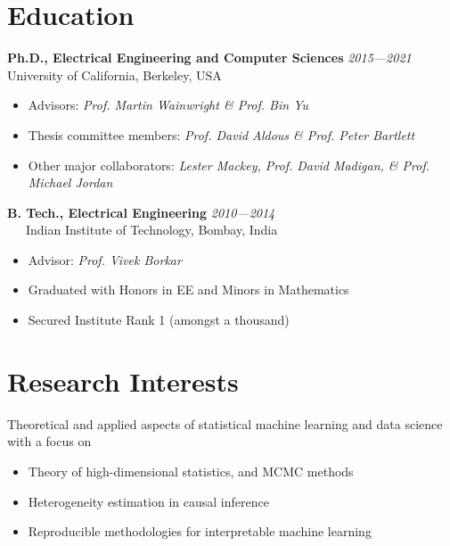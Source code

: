 \documentclass[margin,centered]{res}
\begin{document}
\begin{resume}
\section{
\sc Education} 
{\bf Ph.D., Electrical Engineering and Computer Sciences}
\hspace{3.97cm}
\emph{2015---2021}\\[1mm]
\quad  University of California, Berkeley, USA \\
\begin{itemize}\itemsep0em
\item Advisors: \emph{Prof. Martin Wainwright \& Prof. Bin Yu}
\item Thesis committee members: \emph{Prof. David Aldous \& Prof.
Peter Bartlett}
\item Other major collaborators: \emph{Lester Mackey, Prof. David Madigan, \& Prof. Michael Jordan}
\end{itemize}


{\bf  B. Tech., Electrical Engineering }
\hspace{7.8cm}\emph{2010---2014}
\\[1mm]
\ \ \ Indian Institute of Technology, Bombay, India \\
\begin{itemize}
\item Advisor: \emph{Prof. Vivek Borkar}
\item Graduated with Honors in EE and Minors in Mathematics
\item Secured Institute Rank 1 (amongst a thousand)
\end{itemize}
 
 
\section{
\sc Research Interests} 
Theoretical and applied aspects of statistical
machine learning and data science with a focus on
\\
\begin{itemize}
\item Theory of high-dimensional statistics, and MCMC methods
\item Heterogeneity estimation in causal inference
\item Reproducible methodologies for interpretable machine learning
\end{itemize}


\end{resume}
\end{document}
